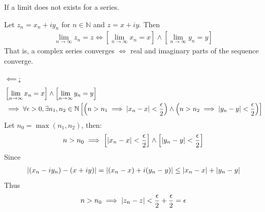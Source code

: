 \documentclass[12pt, english]{book}
\makeatletter
\renewenvironment{proof}[1][\proofname]{\par
	\pushQED{\qed}%
	\normalfont \topsep6\p@\@plus6\p@\relax
	\list{}{%
		\settowidth{\leftmargin}{\itshape\proofname:\hskip\labelsep}%
		\setlength{\labelwidth}{0pt}%
		\setlength{\itemindent}{-\leftmargin}%
		}%
	\item[\hskip\labelsep\itshape#1\@addpunct{:}]\ignorespaces
	}{\popQED\endlist\@endpefalse}
\makeatother
\begin{document}
	\begin{definition}
		If a limit does not exists for a series.
	\end{definition}
	
	\begin{theorem}
		Let \(z_n = x_n + i y_n\) for \(n \in \mathbb{N}\) and \(z = x + iy\). Then 
		\begin{align*}
			\lim_{n \rightarrow \infty} z_n = z 
			\iff \left[\lim_{n \rightarrow \infty} x_n = x \right] \land 
				 \left[\lim_{n \rightarrow \infty} y_n = y \right] 
		\end{align*}
		That is, a complex series converges \(\iff\) real and imaginary parts of the sequence converge.
	\end{theorem}
	\begin{proof}
		\underline{\(\impliedby \):}		
		\begin{align*}
			&\left[\lim_{n \rightarrow \infty} x_n = x \right] \land 
			 \left[\lim_{n \rightarrow \infty} y_n = y \right] \\
			&\implies \forall \epsilon > 0, \exists n_1, n_2 \in \mathbb{N}
				\left[\left(n > n_1 \implies \abs{x_n - x} < \frac{\epsilon}{2}\right) \land \left(n > n_2 \implies \abs{y_n - y} < \frac{\epsilon}{2}\right)\right]
		\end{align*}
		Let \(n_0 = \max(n_1, n_2)\), then:
		\begin{align*}
			n > n_0 
			\implies \left[\abs{x_n - x} < \frac{\epsilon}{2} \right]
				\land \left[\abs{y_n - y} < \frac{\epsilon}{2} \right]
		\end{align*}
		Since
		\begin{align*}
			\abs{(x_n - i y_n) - (x + iy)} = \abs{(x_n - x) + i(y_n - y)} \leq \abs{x_n - x} + \abs{y_n - y}
		\end{align*}
		Thus 
		\begin{align*}
			n > n_0 \implies \abs{z_n - z} < \frac{\epsilon}{2} + \frac{\epsilon}{2} = \epsilon
		\end{align*}
		

\end{proof}
\end{document}
